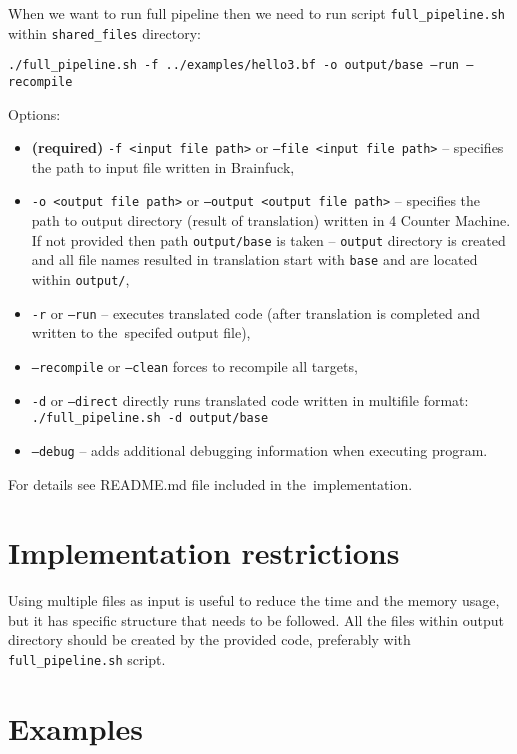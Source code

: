 \documentclass[english,shortabstract,mgr]{iithesis}
\begin{document}
When we want to run full pipeline then we need to run script \texttt{full\_pipeline.sh} within
\texttt{shared\_files} directory:

\hspace{-1.25cm}
\texttt{./full\_pipeline.sh -f ../examples/hello3.bf -o output/base --run --recompile}

Options:
\begin{itemize}
  \item\textbf{(required)} \texttt{-f <input file path>} or \texttt{--file <input file path>} -- specifies
      the path to input file written in Brainfuck,
  \item \texttt{-o <output file path>} or \texttt{--output <output file path>} -- specifies
      the path to output directory (result of translation) written in 4 Counter Machine. If not
      provided then path \texttt{output/base} is taken -- \texttt{output} directory
      is created and all file names resulted in translation start with \texttt{base}
      and are located within \texttt{output/},
  \item \texttt{-r} or \texttt{--run} -- executes translated code (after translation is completed
      and written to the~specifed output file),
  \item \texttt{--recompile} or \texttt{--clean} forces to recompile all targets,
  \item \texttt{-d} or \texttt{--direct} directly runs translated code written
      in multifile format: \\ \texttt{./full\_pipeline.sh -d output/base}
  \item \texttt{--debug} -- adds additional debugging information when executing program.
\end{itemize}

For details see README.md file included in the~implementation.

\section{Implementation restrictions}

Using multiple files as input is useful to reduce the time and the memory
usage, but it has specific structure that needs to be followed. All the files
within output directory should be created by the provided code, preferably
with \texttt{full\_pipeline.sh} script.

\section{Examples}
\end{document}
